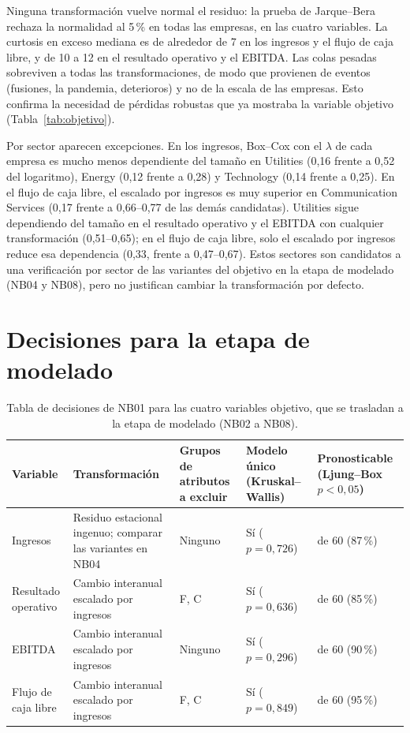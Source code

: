 \documentclass[12pt,letterpaper,oneside]{report}
\renewcommand{\_}{\UnderscoreOriginal\allowbreak}
\begin{document}
Ninguna transformación vuelve normal el residuo: la prueba de Jarque--Bera rechaza la normalidad al 5\,\% en todas las empresas, en las cuatro variables. La curtosis en exceso mediana es de alrededor de 7 en los ingresos y el flujo de caja libre, y de 10 a 12 en el resultado operativo y el EBITDA. Las colas pesadas sobreviven a todas las transformaciones, de modo que provienen de eventos (fusiones, la pandemia, deterioros) y no de la escala de las empresas. Esto confirma la necesidad de pérdidas robustas que ya mostraba la variable objetivo (Tabla~\ref{tab:objetivo}).

Por sector aparecen excepciones. En los ingresos, Box--Cox con el $\lambda$ de cada empresa es mucho menos dependiente del tamaño en Utilities (0,16 frente a 0,52 del logaritmo), Energy (0,12 frente a 0,28) y Technology (0,14 frente a 0,25). En el flujo de caja libre, el escalado por ingresos es muy superior en Communication Services (0,17 frente a 0,66--0,77 de las demás candidatas). Utilities sigue dependiendo del tamaño en el resultado operativo y el EBITDA con cualquier transformación (0,51--0,65); en el flujo de caja libre, solo el escalado por ingresos reduce esa dependencia (0,33, frente a 0,47--0,67). Estos sectores son candidatos a una verificación por sector de las variantes del objetivo en la etapa de modelado (NB04 y NB08), pero no justifican cambiar la transformación por defecto.

\section{Decisiones para la etapa de modelado}
\label{sec:decisiones}

\begin{table}[H]
\centering
\caption{Tabla de decisiones de NB01 para las cuatro variables objetivo, que se trasladan a la etapa de modelado (NB02 a NB08).}
\label{tab:decisiones}
\small
\begin{tabular}{@{}>{\raggedright}p{2.3cm}>{\raggedright}p{3.4cm}>{\raggedright}p{2.2cm}>{\raggedright}p{2.4cm}>{\raggedright\arraybackslash}p{3.3cm}@{}}
\toprule
Variable & Transformación & Grupos de atributos a excluir & Modelo único (Kruskal--Wallis) & Pronosticable (Ljung--Box $p < 0{,}05$) \\
\midrule
Ingresos & Residuo estacional ingenuo; comparar las variantes en NB04 & Ninguno & Sí ($p = 0{,}726$) & 52 de 60 (87\,\%) \\
Resultado operativo & Cambio interanual escalado por ingresos & F, C & Sí ($p = 0{,}636$) & 51 de 60 (85\,\%) \\
EBITDA & Cambio interanual escalado por ingresos & Ninguno & Sí ($p = 0{,}296$) & 54 de 60 (90\,\%) \\
Flujo de caja libre & Cambio interanual escalado por ingresos & F, C & Sí ($p = 0{,}849$) & 57 de 60 (95\,\%) \\
\bottomrule
\end{tabular}
\end{table}
\end{document}
